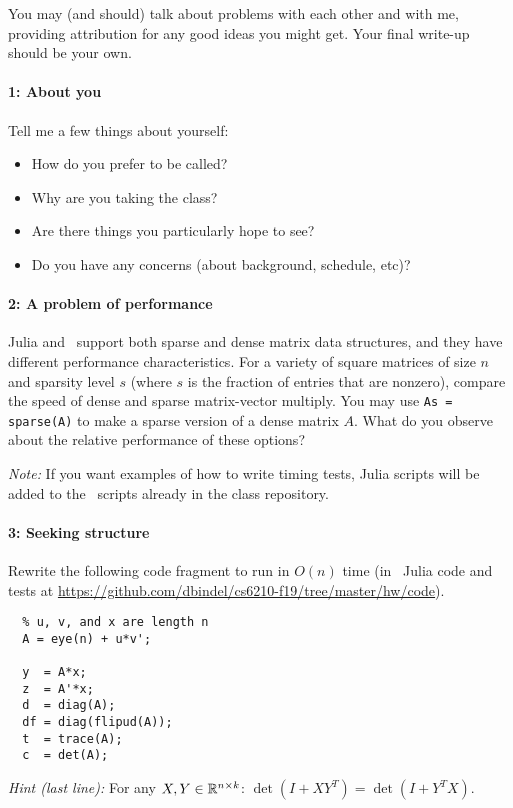 \documentclass[12pt, leqno]{article} %
\begin{document}

You may (and should) talk about problems with each other and with me,
providing attribution for any good ideas you might get.  Your final
write-up should be your own.

\paragraph*{1: About you}
Tell me a few things about yourself:
\begin{itemize}
\item How do you prefer to be called?
\item Why are you taking the class?
\item Are there things you particularly hope to see?
\item Do you have any concerns (about background, schedule, etc)?
\end{itemize}

\paragraph*{2: A problem of performance}
Julia and \matlab\ support both sparse and dense matrix data structures,
and they have different performance characteristics.  For a variety
of square matrices of size $n$ and sparsity level $s$ (where $s$ is
the fraction of entries that are nonzero), compare the speed of dense
and sparse matrix-vector multiply.  You may use {\tt As = sparse(A)}
to make a sparse version of a dense matrix $A$.  What do you observe
about the relative performance of these options?

{\em Note:} If you want examples of how to write timing tests, Julia
scripts will be added to the \matlab\ scripts already in the class
repository.

\paragraph*{3: Seeking structure}
Rewrite the following code fragment to run in $O(n)$ time
(in \matlab\, Julia code and tests at \url{https://github.com/dbindel/cs6210-f19/tree/master/hw/code}).
\begin{lstlisting}
  % u, v, and x are length n
  A = eye(n) + u*v';
  
  y  = A*x;
  z  = A'*x;
  d  = diag(A);
  df = diag(flipud(A));
  t  = trace(A);
  c  = det(A);
\end{lstlisting}

{\em Hint (last line):} For any $X, Y \in \mathbb{R}^{n \times k}$:
$\det(I+XY^T) = \det(I+Y^T X)$.
\end{document}
